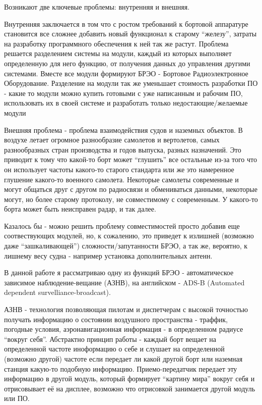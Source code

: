 \documentclass[a4paper,12pt]{report} %
\begin{document}
Возникают две ключевые проблемы: внутренняя и внешняя.

Внутренняя заключается в том что с ростом требований к бортовой аппаратуре
становится все сложнее добавить новый функционал к старому ``железу'', затраты
на разработку программного обеспечения к ней так же растут. Проблема решается
разделением системы на модули, каждый из которых выполняет определенную для него
функцию, от получения данных до управления другими системами. Вместе все модули
формируют БРЭО - Бортовое Радиоэлектронное Оборудование. Разделение на модули
так же уменьшает стоимость разработки ПО - какие то модули можно купить готовыми
с уже написанным и рабочим ПО, использовать их в своей системе и разработать
только недостающие/желаемые модули

Внешняя проблема - проблема взаимодействия судов и наземных объектов. В воздухе
летает огромное разнообразие самолетов и вертолетов, самых разнообразных стран
производства и годов выпуска, разных назначений. Это приводит к тому что
какой-то борт может ``глушить'' все остальные из-за того что он использует
частоты какого-то старого стандарта или же это намеренное глушение какого-то
военного самолета. Некоторые самолеты современные и могут общаться друг с другом
по радиосвязи и обмениваться данными, некоторые могут, но более старому
протоколу, не совместимому с современным. У какого-то борта может быть
неисправен радар, и так далее.

Казалось бы - можно решить проблему совместимостей просто добавив еще
соотвествующих модулей, но, к сожалению, это приведет к излишней (возможно даже
``зашкаливающей'') сложности/запутанности БРЭО, а так же, вероятно, к лишнему
весу судна - например установка дополнительных антенн.

В данной работе я рассматриваю одну из функций БРЭО - автоматическое зависимое
наблюдение-вещание (АЗНВ), на английском - ADS-B (Automated dependent
survelliance-broadcast). 

АЗНВ - технология позволяющая пилотам и диспетчерам с высокой точностью получать
информацию о состоянии воздушного пространства - траффик, погодные условия,
аэронавигационная информация - в определенном радиусе ``вокруг себя''.
Абстрактно принцип работы - каждый борт вещает на определенной частоте иноформацию о себе и
слушает на определенной (возможно другой) частоте если передает ли какой другой
борт или наземная станция какую-то подобную информацию. Приемо-передатчик
передает эту информацию в другой модуль, который формирует ``картину мира''
вокруг себя и отрисовывает её на дисплее, возможно что отрисовкой занимается
другой модуль или ПО.
\end{document}
